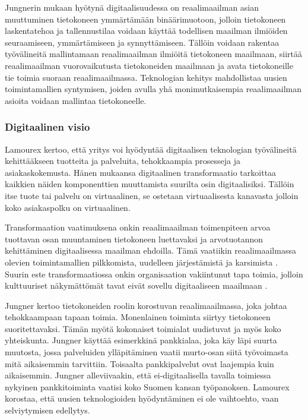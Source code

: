 \documentclass[finnish,12pt,a4paper,pdftex]{article}
\begin{document}
Jungnerin \citeyearpar{jungner} mukaan hyötynä digitaalisuudessa on reaalimaailman asian muuttuminen tietokoneen ymmärtämään binäärimuotoon, jolloin tietokoneen laskentatehoa ja tallennustilaa voidaan käyttää todellisen maailman ilmiöiden seuraamiseen, ymmärtämiseen ja synnyttämiseen. Tällöin voidaan rakentaa työvälineitä mallintamaan reaalimaailman ilmiöitä tietokoneen maailmaan, siirtää reaalimaailman vuorovaikutusta tietokoneiden maailmaan ja avata tietokoneille tie toimia suoraan reaalimaailmassa. Teknologian kehitys mahdollistaa uusien toimintamallien syntymisen, joiden avulla yhä monimutkaisempia reaalimaailman asioita voidaan mallintaa tietokoneelle.

\subsubsection{Digitaalinen visio}

Lamourex \citeyearpar{lamoureux} kertoo, että yritys voi hyödyntää digitaalisen teknologian työvälineitä kehittääkseen tuotteita ja palveluita, tehokkaampia prosesseja ja asiakaskokemusta. Hänen mukaansa digitaalinen transformaatio tarkoittaa kaikkien näiden komponenttien muuttamista suurilta osin digitaalisiksi. Tällöin itse tuote tai palvelu on virtuaalinen, se ostetaan virtuaalisesta kanavasta jolloin koko asiakaspolku on virtuaalinen. 

Transformaation vaatimuksena onkin reaalimaailman toimenpiteen arvoa tuottavan osan muuntaminen tietokoneen luettavaksi ja arvotuotannon kehittäminen digitaalisessa maailman ehdoilla. Tämä vaatiikin reaalimaailmassa olevien toimintamallien pilkkomista, uudelleen järjestämistä ja karsimista \citep{leanit}. Suurin este transformaatiossa onkin organisaation vakiintunut tapa toimia, jolloin kulttuuriset näkymättömät tavat eivät sovellu digitaaliseen maailmaan \citep{jungner, lamoureux}.

Jungner \citeyearpar{jungner} kertoo tietokoneiden roolin korostuvan reaalimaailmassa, joka johtaa tehokkaampaan tapaan toimia. Monenlainen toiminta siirtyy tietokoneen suoritettavaksi. Tämän myötä kokonaiset toimialat uudistuvat ja myös koko yhteiskunta. Jungner käyttää esimerkkinä pankkialaa, joka käy läpi suurta muutosta, jossa palveluiden ylläpitäminen vaatii murto-osan siitä työvoimasta mitä aikaisemmin tarvittiin. Toisaalta pankkipalvelut ovat laajempia kuin aikaisemmin. Jungner alleviivaakin, että ei-digitaalisella tavalla toimiessa nykyinen pankkitoiminta vaatisi koko Suomen kansan työpanoksen. Lamourex \citeyearpar{lamoureux} korostaa, että
uusien teknologioiden hyödyntäminen ei ole vaihtoehto, vaan selviytymisen edellytys.
\end{document}
